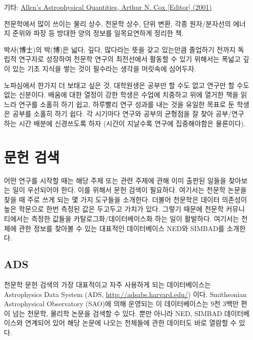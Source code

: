 \begin{packed_item}
\item 기타:
  \href{http://www.amazon.com/Allens-Astrophysical-Quantities-Arthur-Cox/dp/038795189X}{Allen's
    Astrophysical Quantities, \textsf{Arthur N. Cox [Editor] (2001)}}
\begin{packed_item}
\item 천문학에서 많이 쓰이는 물리 상수, 천문학 상수, 단위 변환, 각종
  원자/분자선의 에너지 준위와 파장 등 방대한 양의 정보를 일목요연하게 정리한 책.
\end{packed_item}

\end{packed_item}

박사(博士)의 박(博)은 넓다, 깊다, 많다라는 뜻을 갖고 있는만큼 졸업하기 전까지
독립적 연구자로 성장하여 천문학 연구의 최전선에서 활동할 수 있기 위해서는 폭넓고
깊이 있는 기초 지식을 쌓는 것이 필수라는 생각을 머릿속에 심어두자.  \starbreak

노파심에서 한가지 더 보태고 싶은 것, 대학원생은 공부만 할 수도 없고 연구만 할
수도 없는 신분이다. 배움에 대한 열정이 강한 학생은 수업에 치중하고 위에 열거한
책을 읽느라 연구를 소홀히 하기 쉽고, 하루빨리 연구 성과를 내는 것을 유일한 목표로
둔 학생은 공부를 소홀히 하기 쉽다. 각 시기마다 연구와 공부의 균형점을 잘 찾아
공부/연구하는 시간 배분에 신경쓰도록 하자 (시간이 지날수록 연구에 집중해야함은
물론이다).

\section{문헌 검색}
어떤 연구를 시작할 때는 해당 주제 또는 관련 주제에 관해 이미 출판된 일들을
찾아보는 일이 우선되어야 한다. 이를 위해서 문헌 검색이 필요하다. 여기서는 천문학
논문을 찾을 때 주로 쓰게 되는 몇 가지 도구들을 소개한다. 더불어 천문학은 데이터
의존성이 높은 학문으로 한번 측정된 값은 두고두고 가치가 있다. 그렇기 때문에
천문학 커뮤니티에서는 측정한 값들을 카탈로그화/데이터베이스화 하는 일이
활발하다. 여기서는 천체에 관한 정보를 찾아볼 수 있는 대표적인 데이터베이스 NED와
SIMBAD를 소개한다.

\subsection{ADS}
천문학 문헌 검색의 가장 대표적이고 자주 사용하게 되는 데이터베이스는
Astrophysics Data System (ADS, \url{http://adsabs.harvard.edu/})
이다. Smithsonian Astrophysical Observatory (SAO)에 의해 운영되는 이
데이터베이스는 9천 3백만 편이 넘는 천문학, 물리학 논문을 검색할 수 있다. 뿐만
아니라 NED, SIMBAD 데이터베이스와 연계되어 있어 해당 논문에 나오는 천체들에 관한
데이터도 바로 열람할 수 있다.

